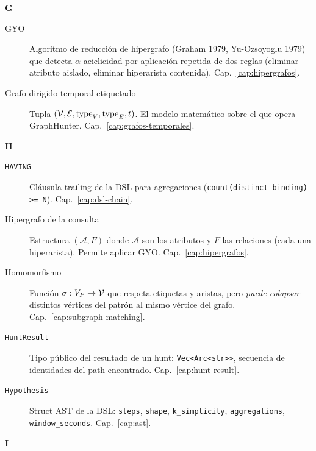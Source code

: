 \noindent
\textbf{G}

\begin{description}
    \item[GYO] Algoritmo de reducción de hipergrafo (Graham 1979,
    Yu-Ozsoyoglu 1979) que detecta \(\alpha\)-aciclicidad por
    aplicación repetida de dos reglas (eliminar atributo aislado,
    eliminar hiperarista contenida). Cap.~\ref{cap:hipergrafos}.

    \item[Grafo dirigido temporal etiquetado] Tupla
    \((\mathcal{V}, \mathcal{E}, \mathrm{type}_V, \mathrm{type}_E, t)\). El modelo
    matemático sobre el que opera GraphHunter.
    Cap.~\ref{cap:grafos-temporales}.
\end{description}

\noindent
\textbf{H}

\begin{description}
    \item[\texttt{HAVING}] Cláusula trailing de la DSL para
    agregaciones (\texttt{count(distinct binding) >= N}).
    Cap.~\ref{cap:dsl-chain}.

    \item[Hipergrafo de la consulta] Estructura
    \((\mathcal{A}, F)\) donde \(\mathcal{A}\) son los atributos y
    \(F\) las relaciones (cada una hiperarista). Permite aplicar
    GYO. Cap.~\ref{cap:hipergrafos}.

    \item[Homomorfismo] Función \(\sigma : V_P \to \mathcal{V}\) que
    respeta etiquetas y aristas, pero \emph{puede colapsar}
    distintos vértices del patrón al mismo vértice del grafo.
    Cap.~\ref{cap:subgraph-matching}.

    \item[\texttt{HuntResult}] Tipo público del resultado de un
    hunt: \texttt{Vec<Arc<str>>}, secuencia de identidades del path
    encontrado. Cap.~\ref{cap:hunt-result}.

    \item[\texttt{Hypothesis}] Struct AST de la DSL: \texttt{steps},
    \texttt{shape}, \texttt{k\_simplicity}, \texttt{aggregations},
    \texttt{window\_seconds}. Cap.~\ref{cap:ast}.
\end{description}

\noindent
\textbf{I}

